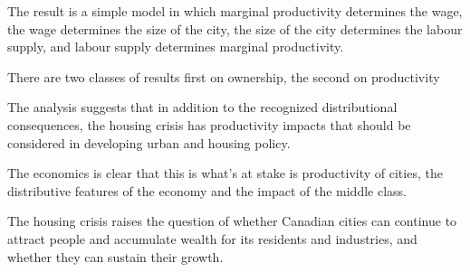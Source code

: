 The result is a simple model in which marginal productivity determines the wage, the wage determines the size of the city, the size of the city determines the labour supply, and labour supply determines marginal productivity. 


There are two classes of results first on ownership, the second on productivity

The analysis suggests that in addition to the recognized distributional consequences, the housing crisis has productivity impacts that should be considered in developing urban and housing policy. 


The economics is clear that this is what's at stake is productivity of cities, the distributive features of the economy and the impact of the middle class. 


The housing crisis raises the question of whether Canadian cities can continue to attract people and accumulate wealth for its residents and industries, and whether they can sustain their growth.







